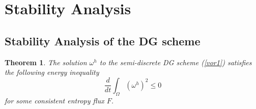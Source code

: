 \documentclass[11pt]{article}
\newtheorem{theorem}{Theorem}[section]
\begin{document}
\section{Stability Analysis}
\subsection{Stability Analysis of the DG scheme}
\begin{theorem}
The solution $\omega^h$ to the semi-discrete DG scheme (\ref{vor1}) satisfies the following energy inequality
\begin{equation}\label{cellener}
\frac{d}{dt} \int_\Omega (\omega^h)^2 \leq 0
\end{equation}
for some consistent entropy flux $F$.

\end{theorem}
\end{document}
